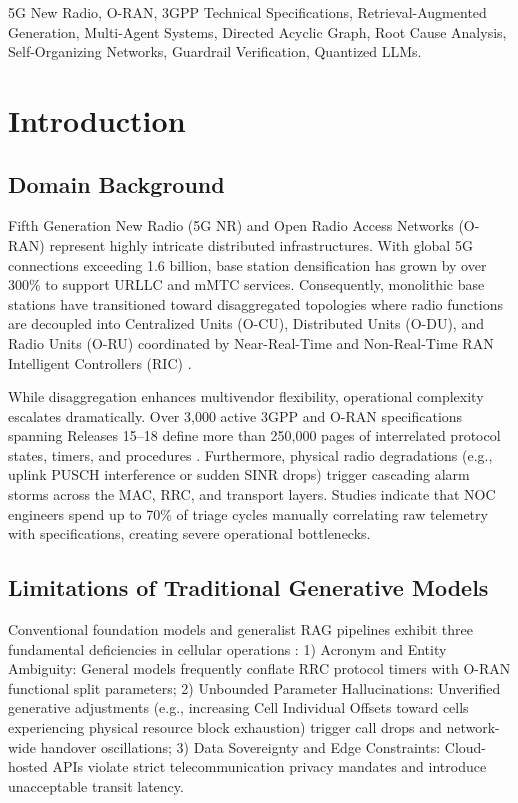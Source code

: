 \documentclass[conference]{IEEEtran}
\begin{document}
\begin{IEEEkeywords}
5G New Radio, O-RAN, 3GPP Technical Specifications, Retrieval-Augmented Generation, Multi-Agent Systems, Directed Acyclic Graph, Root Cause Analysis, Self-Organizing Networks, Guardrail Verification, Quantized LLMs.
\end{IEEEkeywords}

\section{Introduction}

\subsection{Domain Background}
Fifth Generation New Radio (5G NR) and Open Radio Access Networks (O-RAN) represent highly intricate distributed infrastructures. With global 5G connections exceeding 1.6 billion, base station densification has grown by over 300\% to support URLLC and mMTC services. Consequently, monolithic base stations have transitioned toward disaggregated topologies where radio functions are decoupled into Centralized Units (O-CU), Distributed Units (O-DU), and Radio Units (O-RU) coordinated by Near-Real-Time and Non-Real-Time RAN Intelligent Controllers (RIC) \cite{polese2023}.

While disaggregation enhances multivendor flexibility, operational complexity escalates dramatically. Over 3,000 active 3GPP and O-RAN specifications spanning Releases 15--18 define more than 250,000 pages of interrelated protocol states, timers, and procedures \cite{ts38331, ts38213, oran_e2ap}. Furthermore, physical radio degradations (e.g., uplink PUSCH interference or sudden SINR drops) trigger cascading alarm storms across the MAC, RRC, and transport layers. Studies indicate that NOC engineers spend up to 70\% of triage cycles manually correlating raw telemetry with specifications, creating severe operational bottlenecks.

\subsection{Limitations of Traditional Generative Models}
Conventional foundation models and generalist RAG pipelines exhibit three fundamental deficiencies in cellular operations \cite{maatouk2024}: 1) Acronym and Entity Ambiguity: General models frequently conflate RRC protocol timers with O-RAN functional split parameters; 2) Unbounded Parameter Hallucinations: Unverified generative adjustments (e.g., increasing Cell Individual Offsets toward cells experiencing physical resource block exhaustion) trigger call drops and network-wide handover oscillations; 3) Data Sovereignty and Edge Constraints: Cloud-hosted APIs violate strict telecommunication privacy mandates and introduce unacceptable transit latency.
\end{document}
